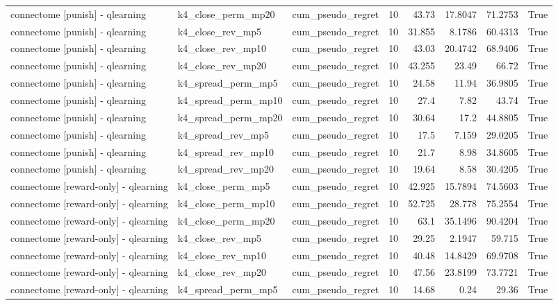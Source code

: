 \begin{table}[t]
\begin{tabular}{lllrrrrr}
connectome [punish] - qlearning & k4\_close\_perm\_mp20 & cum\_pseudo\_regret & 10 & 43.73 & 17.8047 & 71.2753 & True \\
connectome [punish] - qlearning & k4\_close\_rev\_mp5 & cum\_pseudo\_regret & 10 & 31.855 & 8.1786 & 60.4313 & True \\
connectome [punish] - qlearning & k4\_close\_rev\_mp10 & cum\_pseudo\_regret & 10 & 43.03 & 20.4742 & 68.9406 & True \\
connectome [punish] - qlearning & k4\_close\_rev\_mp20 & cum\_pseudo\_regret & 10 & 43.255 & 23.49 & 66.72 & True \\
connectome [punish] - qlearning & k4\_spread\_perm\_mp5 & cum\_pseudo\_regret & 10 & 24.58 & 11.94 & 36.9805 & True \\
connectome [punish] - qlearning & k4\_spread\_perm\_mp10 & cum\_pseudo\_regret & 10 & 27.4 & 7.82 & 43.74 & True \\
connectome [punish] - qlearning & k4\_spread\_perm\_mp20 & cum\_pseudo\_regret & 10 & 30.64 & 17.2 & 44.8805 & True \\
connectome [punish] - qlearning & k4\_spread\_rev\_mp5 & cum\_pseudo\_regret & 10 & 17.5 & 7.159 & 29.0205 & True \\
connectome [punish] - qlearning & k4\_spread\_rev\_mp10 & cum\_pseudo\_regret & 10 & 21.7 & 8.98 & 34.8605 & True \\
connectome [punish] - qlearning & k4\_spread\_rev\_mp20 & cum\_pseudo\_regret & 10 & 19.64 & 8.58 & 30.4205 & True \\
connectome [reward-only] - qlearning & k4\_close\_perm\_mp5 & cum\_pseudo\_regret & 10 & 42.925 & 15.7894 & 74.5603 & True \\
connectome [reward-only] - qlearning & k4\_close\_perm\_mp10 & cum\_pseudo\_regret & 10 & 52.725 & 28.778 & 75.2554 & True \\
connectome [reward-only] - qlearning & k4\_close\_perm\_mp20 & cum\_pseudo\_regret & 10 & 63.1 & 35.1496 & 90.4204 & True \\
connectome [reward-only] - qlearning & k4\_close\_rev\_mp5 & cum\_pseudo\_regret & 10 & 29.25 & 2.1947 & 59.715 & True \\
connectome [reward-only] - qlearning & k4\_close\_rev\_mp10 & cum\_pseudo\_regret & 10 & 40.48 & 14.8429 & 69.9708 & True \\
connectome [reward-only] - qlearning & k4\_close\_rev\_mp20 & cum\_pseudo\_regret & 10 & 47.56 & 23.8199 & 73.7721 & True \\
connectome [reward-only] - qlearning & k4\_spread\_perm\_mp5 & cum\_pseudo\_regret & 10 & 14.68 & 0.24 & 29.36 & True \\

\end{tabular}
\end{table}
